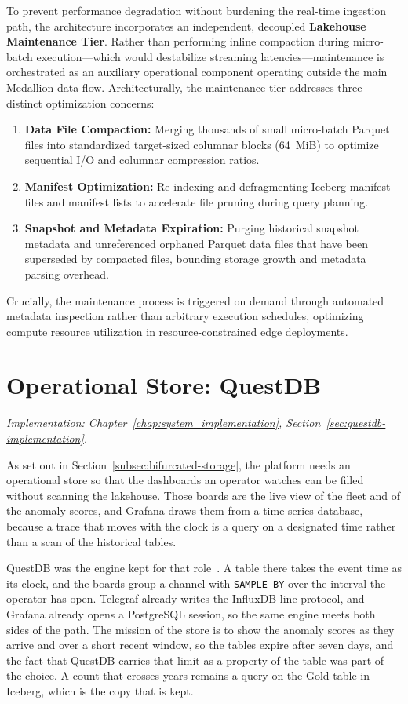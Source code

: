 To prevent performance degradation without burdening the real-time ingestion path, the architecture incorporates an independent, decoupled \textbf{Lakehouse Maintenance Tier}. Rather than performing inline compaction during micro-batch execution---which would destabilize streaming latencies---maintenance is orchestrated as an auxiliary operational component operating outside the main Medallion data flow. Architecturally, the maintenance tier addresses three distinct optimization concerns:
\begin{enumerate}
    \item \textbf{Data File Compaction:} Merging thousands of small micro-batch Parquet files into standardized target-sized columnar blocks (64~MiB) to optimize sequential I/O and columnar compression ratios.
    \item \textbf{Manifest Optimization:} Re-indexing and defragmenting Iceberg manifest files and manifest lists to accelerate file pruning during query planning.
    \item \textbf{Snapshot and Metadata Expiration:} Purging historical snapshot metadata and unreferenced orphaned Parquet data files that have been superseded by compacted files, bounding storage growth and metadata parsing overhead.
\end{enumerate}
Crucially, the maintenance process is triggered on demand through automated metadata inspection rather than arbitrary execution schedules, optimizing compute resource utilization in resource-constrained edge deployments.

\section{Operational Store: QuestDB}
\label{subsec:arch_questdb}
\textit{Implementation: Chapter~\ref{chap:system_implementation}, Section~\ref{sec:questdb-implementation}.}

As set out in Section~\ref{subsec:bifurcated-storage}, the platform needs an operational store so that the dashboards an operator watches can be filled without scanning the lakehouse. Those boards are the live view of the fleet and of the anomaly scores, and Grafana draws them from a time-series database, because a trace that moves with the clock is a query on a designated time rather than a scan of the historical tables.

QuestDB was the engine kept for that role~\cite{questdb}. A table there takes the event time as its clock, and the boards group a channel with \texttt{SAMPLE BY} over the interval the operator has open. Telegraf already writes the InfluxDB line protocol, and Grafana already opens a PostgreSQL session, so the same engine meets both sides of the path. The mission of the store is to show the anomaly scores as they arrive and over a short recent window, so the tables expire after seven days, and the fact that QuestDB carries that limit as a property of the table was part of the choice. A count that crosses years remains a query on the Gold table in Iceberg, which is the copy that is kept.


